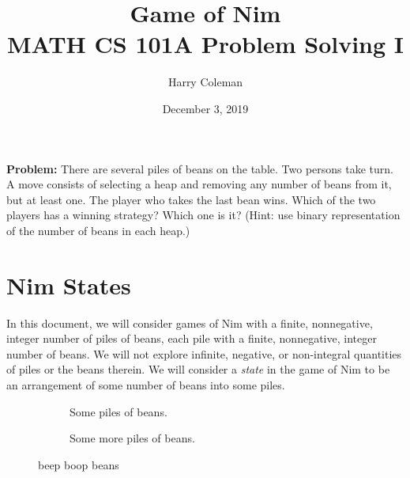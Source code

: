 \documentclass[12pt]{article}
\begin{document}
 
\title{Game of Nim\\
    \large MATH CS 101A Problem Solving I}
\author{Harry Coleman}
\date{December 3, 2019}

\maketitle

\begin{framed}\noindent
    \textbf{Problem:} There are several piles of beans on the table. Two persons take turn. A move consists of selecting a heap and removing any number of beans from it, but at least one. The player who takes the last bean wins. Which of the two players has a winning strategy? Which one is it? (Hint: use binary representation of the number of beans in each heap.)
\end{framed}

\section{Nim States}
In this document, we will consider games of Nim with a finite, nonnegative, integer number of piles of beans, each pile with a finite, nonnegative, integer number of beans. We will not explore infinite, negative, or non-integral quantities of piles or the beans therein. We will consider a \emph{state} in the game of Nim to be an arrangement of some number of beans into some piles. 
\begin{figure}[ht]
    \centering
    \begin{subfigure}[b]{.47\textwidth}
        \centering
        \caption{Some piles of beans.}
        \label{fig:bean-example-1}
    \end{subfigure}
    \begin{subfigure}[b]{.47\textwidth}
        \centering
        \caption{Some more piles of beans.}
        \label{fig:bean-example-2}
    \end{subfigure}
    \caption{beep boop beans}
    \label{fig:bean-examples}
\end{figure}
\end{document}
